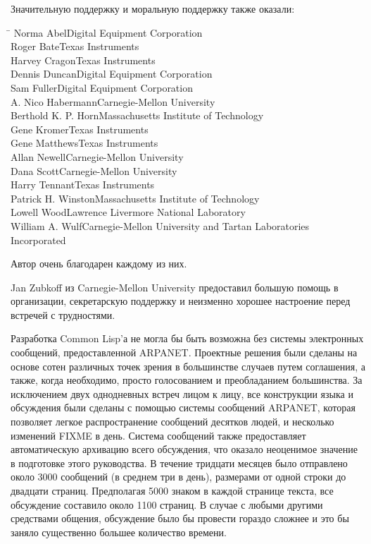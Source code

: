 Значительную поддержку и моральную поддержку также оказали:
\begin{tabbing}
\hskip1.5in\=\kill
Norma Abel\>Digital Equipment Corporation \\
Roger Bate\>Texas Instruments \\
Harvey Cragon\>Texas Instruments \\
Dennis Duncan\>Digital Equipment Corporation \\
Sam Fuller\>Digital Equipment Corporation \\
A. Nico Habermann\>Carnegie-Mellon University \\
Berthold K. P. Horn\>Massachusetts Institute of Technology \\
Gene Kromer\>Texas Instruments \\
Gene Matthews\>Texas Instruments \\
Allan Newell\>Carnegie-Mellon University \\
Dana Scott\>Carnegie-Mellon University \\
Harry Tennant\>Texas Instruments \\
Patrick H. Winston\>Massachusetts Institute of Technology \\
Lowell Wood\>Lawrence Livermore National Laboratory \\
William A. Wulf\>Carnegie-Mellon University and Tartan Laboratories \\
               \>Incorporated
\end{tabbing}
Автор очень благодарен каждому из них.

Jan Zubkoff из Carnegie-Mellon University
предоставил большую помощь в организации, секретарскую поддержку и неизменно
хорошее настроение перед встречей с трудностями.

Разработка Common Lisp'а не могла бы быть возможна без системы электронных
сообщений, предоставленной ARPANET.
Проектные решения были сделаны на основе сотен различных точек зрения в
большинстве случаев путем соглашения, а также, когда необходимо, просто
голосованием и преобладанием большинства.
За исключением двух однодневных встреч лицом к лицу, все конструкции языка и
обсуждения были сделаны с помощью системы сообщений {ARPANET}, которая позволяет легкое
распространение сообщений десятков людей, и несколько изменений FIXME в день.
Система сообщений также предоставляет автоматическую архивацию всего обсуждения,
что оказало неоценимое значение в подготовке этого руководства. В течение
тридцати месяцев было отправлено около 3000 сообщений (в среднем три в день),
размерами от одной строки до двадцати страниц. Предполагая 5000 знаком в каждой
странице текста, все обсуждение составило около 1100 страниц. В случае с любыми другими
средствами общения, обсуждение было бы провести гораздо сложнее и это бы заняло
существенно большее количество времени.

